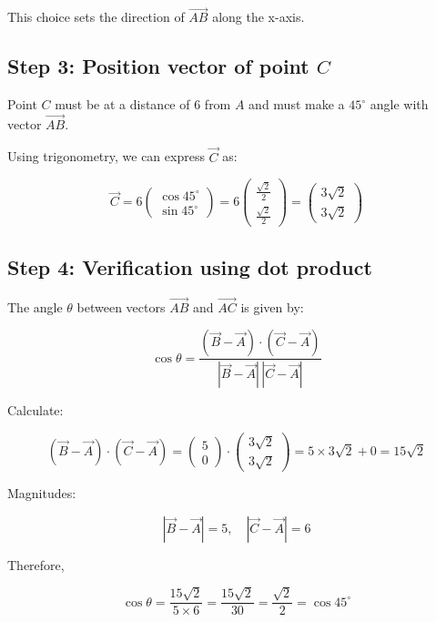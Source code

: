 \documentclass[journal]{IEEEtran}
\begin{document}
This choice sets the direction of $\vec{AB}$ along the x-axis.

\subsection*{\textbf{Step} 3: Position vector of point $C$}

Point $C$ must be at a distance of 6 from $A$ and must make a $45^\circ$ angle with vector $\vec{AB}$.

Using trigonometry, we can express $\vec{C}$ as:

\[
\vec{C} = 6 \begin{pmatrix} \cos 45^\circ \\ \sin 45^\circ \end{pmatrix} 
= 6 \begin{pmatrix} \frac{\sqrt{2}}{2} \\ \frac{\sqrt{2}}{2} \end{pmatrix}
= \begin{pmatrix} 3\sqrt{2} \\ 3\sqrt{2} \end{pmatrix}
\]

\subsection*{\textbf{Step} 4: Verification using dot product}

The angle $\theta$ between vectors $\vec{AB}$ and $\vec{AC}$ is given by:

\[
\cos \theta = \frac{(\vec{B}-\vec{A}) \cdot (\vec{C}-\vec{A})}{|\vec{B}-\vec{A}| \, |\vec{C}-\vec{A}|}
\]

Calculate:

\[
(\vec{B}-\vec{A}) \cdot (\vec{C}-\vec{A}) = \begin{pmatrix}5 \\ 0\end{pmatrix} \cdot \begin{pmatrix}3\sqrt{2} \\ 3\sqrt{2}\end{pmatrix} = 5 \times 3\sqrt{2} + 0 = 15\sqrt{2}
\]

Magnitudes:

\[
|\vec{B}-\vec{A}| = 5, \quad |\vec{C}-\vec{A}| = 6
\]

Therefore,

\[
\cos \theta = \frac{15\sqrt{2}}{5 \times 6} = \frac{15\sqrt{2}}{30} = \frac{\sqrt{2}}{2} = \cos 45^\circ
\]
\end{document}
